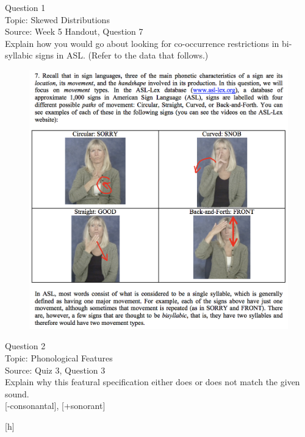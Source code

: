 \documentclass[12pt]{article}
\begin{document}
{\large Question 1}\\

Topic: Skewed Distributions\\
Source: Week 5 Handout, Question 7\\

Explain how you would go about looking for co-occurrence restrictions in bi-syllabic signs in ASL. (Refer to the data that follows.)\\

\begin{figure}[H]
\includegraphics{../images/ASL_movement.png}
\end{figure}

\newpage

{\large Question 2}\\

Topic: Phonological Features\\
Source: Quiz 3, Question 3\\

Explain why this featural specification either does or does not match the given sound.\\

{[-consonantal]}, {[+sonorant]}

{[h]}


\newpage

\begin{center}
\textbf{{\color{red}{\HUGE END OF EXAM}}}\\

\end{center}
\newpage
\end{document}
